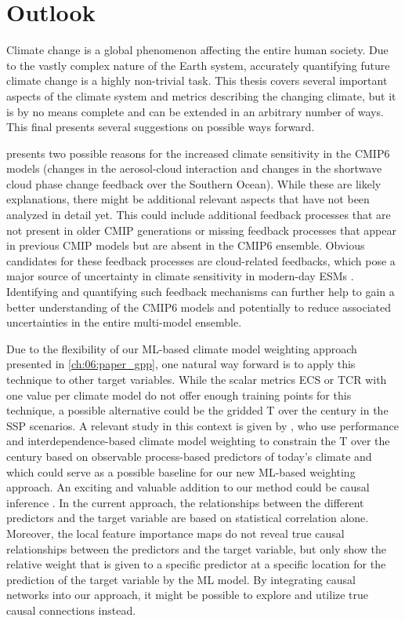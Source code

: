 \section{Outlook}
\label{sec:07:outlook}

Climate change is a global phenomenon affecting the entire human society. Due
to the vastly complex nature of the Earth system, accurately quantifying future
climate change is a highly non-trivial task. This thesis covers several
important aspects of the climate system and metrics describing the changing
climate, but it is by no means complete and can be extended in an arbitrary
number of ways. This final  presents several
suggestions on possible ways forward.

 presents two possible reasons for the
increased climate sensitivity in the \acs{CMIP}6 models (changes in the
aerosol-cloud interaction and changes in the shortwave cloud phase change
feedback over the Southern Ocean). While these are likely explanations, there
might be additional relevant aspects that have not been analyzed in detail yet.
This could include additional feedback processes that are not present in older
\ac{CMIP} generations or missing feedback processes that appear in previous
\ac{CMIP} models but are absent in the \acs{CMIP}6 ensemble. Obvious candidates
for these feedback processes are cloud-related feedbacks, which pose a major
source of uncertainty in climate sensitivity in modern-day \acp{ESM}
\autocite{Boucher2013}. Identifying and quantifying such feedback mechanisms
can further help to gain a better understanding of the \acs{CMIP}6 models and
potentially to reduce associated uncertainties in the entire multi-model
ensemble.

Due to the flexibility of our \ac{ML}-based climate model weighting approach
presented in \cref{ch:06:paper_gpp}, one natural way forward is to apply this
technique to other target variables. While the scalar metrics \ac{ECS} or
\ac{TCR} with one value per climate model do not offer enough training points
for this technique, a possible alternative could be the gridded \acl{T} over
the  century in the \ac{SSP} scenarios. A relevant study in this
context is given by \textcite{Brunner2020}, who use performance and
interdependence-based climate model weighting to constrain the \acl{T} over the
 century based on observable process-based predictors of today's
climate and which could serve as a possible baseline for our new \ac{ML}-based
weighting approach. An exciting and valuable addition to our method could be
causal inference \autocite{Nowack2020, Runge2019}. In the current approach, the
relationships between the different predictors and the target variable are
based on statistical correlation alone. Moreover, the local feature importance
maps do not reveal true causal relationships between the predictors and the
target variable, but only show the relative weight that is given to a specific
predictor at a specific location for the prediction of the target variable by
the \ac{ML} model. By integrating causal networks into our approach, it might
be possible to explore and utilize true causal connections instead.

